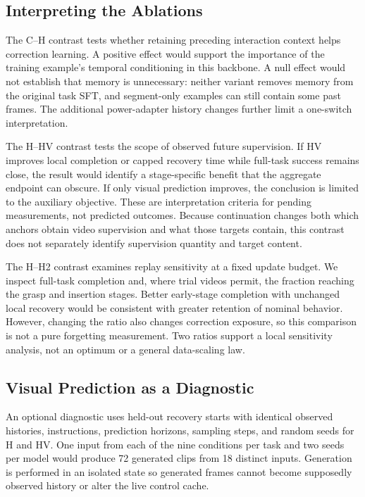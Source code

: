 \documentclass[letterpaper,10pt,conference]{ieeeconf}
\begin{document}
\subsection{Interpreting the Ablations}
The C--H contrast tests whether retaining preceding interaction context helps correction learning. A positive effect would support the importance of the training example's temporal conditioning in this backbone. A null effect would not establish that memory is unnecessary: neither variant removes memory from the original task SFT, and segment-only examples can still contain some past frames. The additional power-adapter history changes further limit a one-switch interpretation.

The H--HV contrast tests the scope of observed future supervision. If HV improves local completion or capped recovery time while full-task success remains close, the result would identify a stage-specific benefit that the aggregate endpoint can obscure. If only visual prediction improves, the conclusion is limited to the auxiliary objective. These are interpretation criteria for pending measurements, not predicted outcomes. Because continuation changes both which anchors obtain video supervision and what those targets contain, this contrast does not separately identify supervision quantity and target content.

The H--H2 contrast examines replay sensitivity at a fixed update budget. We inspect full-task completion and, where trial videos permit, the fraction reaching the grasp and insertion stages. Better early-stage completion with unchanged local recovery would be consistent with greater retention of nominal behavior. However, changing the ratio also changes correction exposure, so this comparison is not a pure forgetting measurement. Two ratios support a local sensitivity analysis, not an optimum or a general data-scaling law.

\subsection{Visual Prediction as a Diagnostic}
An optional diagnostic uses held-out recovery starts with identical observed histories, instructions, prediction horizons, sampling steps, and random seeds for H and HV. One input from each of the nine conditions per task and two seeds per model would produce 72 generated clips from 18 distinct inputs. Generation is performed in an isolated state so generated frames cannot become supposedly observed history or alter the live control cache.
\end{document}
